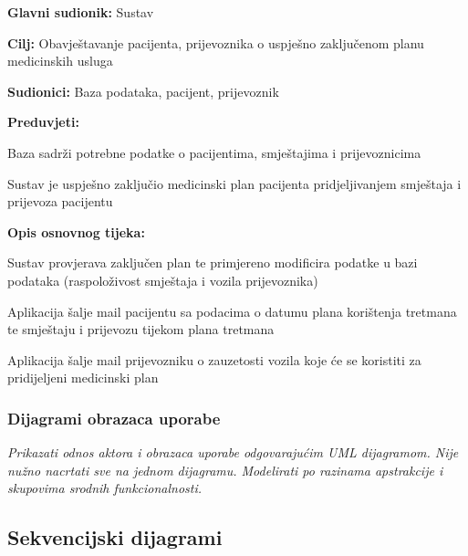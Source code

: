 					\noindent {}
					\begin{packed_item}
						\item \textbf{Glavni sudionik:} Sustav
						\item  \textbf{Cilj:} Obavještavanje pacijenta, prijevoznika o uspješno zaključenom planu medicinskih usluga
						\item  \textbf{Sudionici:} Baza podataka, pacijent, prijevoznik
						\item  \textbf{Preduvjeti:}
						\item[] \begin{packed_enum}
							\item Baza sadrži potrebne podatke o pacijentima, smještajima i prijevoznicima
							\item Sustav je uspješno zaključio medicinski plan pacijenta pridjeljivanjem smještaja i prijevoza pacijentu
						\end{packed_enum}
						
						\item  \textbf{Opis osnovnog tijeka:}
						\item[] \begin{packed_enum}
							\item Sustav provjerava zaključen plan te primjereno modificira podatke u bazi podataka (raspoloživost smještaja i vozila prijevoznika)
							\item Aplikacija šalje mail pacijentu sa podacima o datumu plana korištenja tretmana te smještaju i prijevozu tijekom plana tretmana
							\item Aplikacija šalje mail prijevozniku o zauzetosti vozila koje će se koristiti za pridijeljeni medicinski plan
						\end{packed_enum}
					\end{packed_item}
				\break
					
				\subsubsection{Dijagrami obrazaca uporabe}

					\textit{Prikazati odnos aktora i obrazaca uporabe odgovarajućim UML dijagramom. Nije nužno nacrtati sve na jednom dijagramu. Modelirati po razinama apstrakcije i skupovima srodnih funkcionalnosti.}
				\eject		
				
			\subsection{Sekvencijski dijagrami}
				
